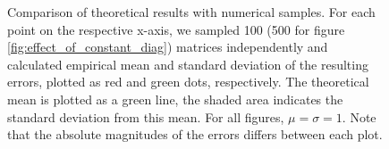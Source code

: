 \documentclass[10pt]{article}
\begin{document}
\begin{figure}[tb]
    \caption{Comparison of theoretical results with numerical samples. 
    For each point on the respective x-axis, we sampled 100 
    (500 for figure \ref{fig:effect_of_constant_diag}) 
    matrices independently and calculated empirical mean and standard deviation
    of the resulting errors, plotted as red and green dots, respectively. 
    The theoretical mean is plotted as a green line, the shaded area indicates
    the standard deviation from this mean. 
    For all figures, $\mu = \sigma = 1$. Note that the absolute magnitudes 
    of the errors differs between each plot. 
}
    \label{fig:comparison}
\end{figure}




\pagestyle{empty}

\end{document}
